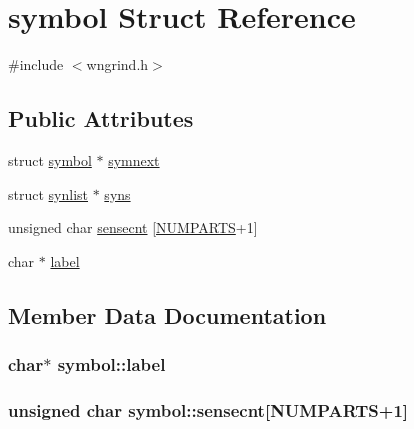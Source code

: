 \hypertarget{structsymbol}{}\section{symbol Struct Reference}
\label{structsymbol}


{\ttfamily \#include $<$wngrind.\+h$>$}

\subsection*{Public Attributes}
\begin{DoxyCompactItemize}
\item 
struct \hyperlink{structsymbol}{symbol} $\ast$ \hyperlink{structsymbol_a5720b8e7b0fbd499f1d001f04d39d67e}{symnext}
\item 
struct \hyperlink{structsynlist}{synlist} $\ast$ \hyperlink{structsymbol_a2cd0744aa0880eab684564abef2ee29e}{syns}
\item 
unsigned char \hyperlink{structsymbol_a797fcb09a193bde8feb95b83b8be14f0}{sensecnt} \mbox{[}\hyperlink{wn_8h_a3d6b4ec100d3ded8506abe9af8757eb9}{N\+U\+M\+P\+A\+R\+TS}+1\mbox{]}
\item 
char $\ast$ \hyperlink{structsymbol_a18eeb23c50b308114cecaf64a042ef6c}{label}
\end{DoxyCompactItemize}


\subsection{Member Data Documentation}
\subsubsection[{\texorpdfstring{label}{label}}]{\setlength{\rightskip}{0pt plus 5cm}char$\ast$ symbol\+::label}\hypertarget{structsymbol_a18eeb23c50b308114cecaf64a042ef6c}{}\label{structsymbol_a18eeb23c50b308114cecaf64a042ef6c}
\subsubsection[{\texorpdfstring{sensecnt}{sensecnt}}]{\setlength{\rightskip}{0pt plus 5cm}unsigned char symbol\+::sensecnt\mbox{[}{\bf N\+U\+M\+P\+A\+R\+TS}+1\mbox{]}}\hypertarget{structsymbol_a797fcb09a193bde8feb95b83b8be14f0}{}\label{structsymbol_a797fcb09a193bde8feb95b83b8be14f0}
